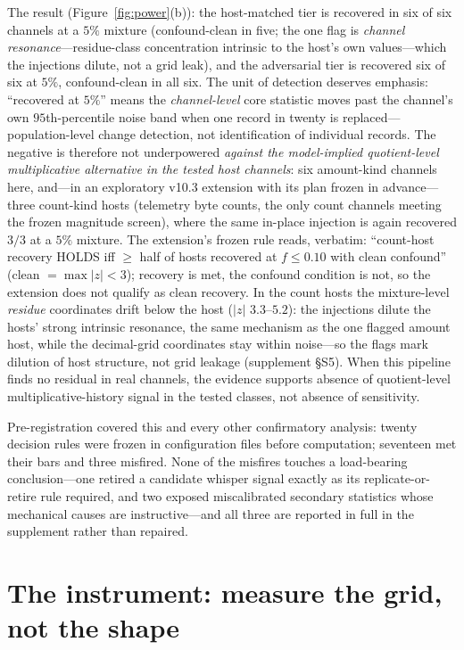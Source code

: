 \documentclass[12pt]{article}
\begin{document}
The result (Figure~\ref{fig:power}(b)): the host-matched tier is recovered in
six of six channels at a $5\%$ mixture (confound-clean in five; the one flag
is \emph{channel resonance}---residue-class concentration intrinsic to the
host's own values---which the injections dilute, not a grid leak), and the
adversarial tier is recovered six of six at $5\%$, confound-clean in all six.
The unit of detection deserves emphasis: ``recovered at $5\%$'' means the
\emph{channel-level} core statistic moves past the channel's own
$95$th-percentile noise band when one record in twenty is replaced---
population-level change detection, not identification of individual records.
The negative is therefore not underpowered \emph{against the model-implied
quotient-level multiplicative alternative in the tested host channels}: six
amount-kind channels here, and---in an exploratory v10.3 extension with its
plan frozen in advance---three count-kind hosts (telemetry byte counts, the
only count channels meeting the frozen magnitude screen), where the same
in-place injection is again recovered $3/3$ at a $5\%$ mixture. The extension's frozen rule reads, verbatim: ``count-host recovery HOLDS
iff $\ge$ half of hosts recovered at $f\le0.10$ with clean confound''
(clean $=\max|z|<3$); recovery is met, the confound condition is not, so
the extension does not qualify as clean recovery. In the count hosts the
mixture-level \emph{residue} coordinates drift below the host
($|z|$ $3.3$--$5.2$): the injections dilute the hosts' strong intrinsic
resonance, the same mechanism as the one flagged amount host, while the
decimal-grid coordinates stay within noise---so the flags mark dilution of
host structure, not grid leakage (supplement \S S5). When this pipeline
finds no residual in real channels, the evidence supports absence of
quotient-level multiplicative-history signal in the tested classes, not
absence of sensitivity.

Pre-registration covered this and every other confirmatory analysis: twenty
decision rules were frozen in configuration files before computation;
seventeen met their bars and three misfired. None of the misfires touches a
load-bearing conclusion---one retired a candidate whisper signal exactly as
its replicate-or-retire rule required, and two exposed miscalibrated secondary
statistics whose mechanical causes are instructive---and all three are
reported in full in the supplement rather than repaired.

\section{The instrument: measure the grid, not the shape}
\label{sec:instrument}
\end{document}
